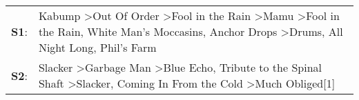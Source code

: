 \begin{supertabular}{p{0.03\textwidth}p{0.92\textwidth}}
 \textbf{S1}:  &  Kabump\textsuperscript{} \textgreater \enspace Out Of Order\textsuperscript{} \textgreater \enspace Fool in the Rain\textsuperscript{} \textgreater \enspace Mamu\textsuperscript{} \textgreater \enspace Fool in the Rain\textsuperscript{}, \enspace White Man's Moccasins\textsuperscript{}, \enspace Anchor Drops\textsuperscript{} \textgreater \enspace Drums\textsuperscript{}, \enspace All Night Long\textsuperscript{}, \enspace Phil's Farm\textsuperscript{}  \enspace  \\
 \textbf{S2}:  &                                                                                                                       Slacker\textsuperscript{} \textgreater \enspace Garbage Man\textsuperscript{} \textgreater \enspace Blue Echo\textsuperscript{}, \enspace Tribute to the Spinal Shaft\textsuperscript{} \textgreater \enspace Slacker\textsuperscript{}, \enspace Coming In From the Cold\textsuperscript{} \textgreater \enspace Much Obliged[1]\textsuperscript{}  \enspace  \\
\end{supertabular}
